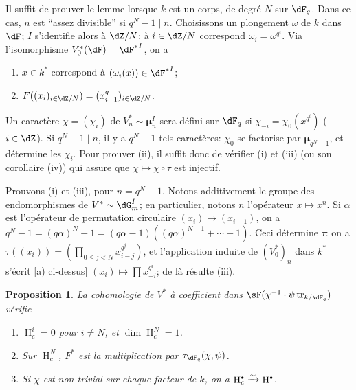 \documentclass[oneside]{book}
\DeclareMathOperator{\h}{H}
\DeclareMathOperator{\tr}{tr}
\newcommand{\dmu}{{\bm\mu}}
\newcommand{\iso}{\xrightarrow\sim}
\theoremstyle{sga-source}
\theoremstyle{sga-source-dash}
\theoremstyle{sga-source-dotdash}
\theoremstyle{sga-source-number-note-dash}
\theoremstyle{sga-source-note-number-dotdash}
\theoremstyle{sga-source-example-dotdash}
\theoremstyle{sga-source-inline-number}
\theoremstyle{sga-source-bare-number}
\theoremstyle{sga-source}
\newtheorem{proposition_}[subsection]{Proposition}
\let\oldbullet\bullet
\renewcommand{\bullet}{\textnormal{\tiny$\oldbullet$}}
\newcommand{\PrintPage}[1]{}\newcommand{\MathPage}[1]{}\newcommand{\PrintCite}[2]{#1}\newcommand{\var}[3]{#2}
\begin{document}
Il suffit de prouver le lemme lorsque $k$ est un corps, de degré $N$ sur 
$\dF_q$. Dans ce cas, $n$ est ``assez divisible'' si $q^N-1\mid n$. 
Choisissons \var{un plongement $\omega$ de $k$ dans $\dF_q$}{un plongement $\omega$ de $k$ dans $\dF$}{S45-SOL-0820}; $I$ s'identifie alors 
à $\dZ/N$: à $i\in \dZ/N$ correspond $\omega_i=\omega^{q^i}$. Via 
l'isomorphisme $V_0^\ast(\dF) = {\dF^\ast}^I$, on a 
\begin{enumerate}[\indent a)]
  \item $x\in k^\ast$ correspond à $(\omega_i(x))\in {\dF^\ast}^I$; 
  \item $F((x_i)_{i\in \dZ/N})=(x_{i-1}^q)_{i\in \dZ/N}$. 
\end{enumerate}

\PrintPage{201}
Un caractère $\chi=(\chi_i)$ de $V_n^\ast\sim \dmu_n^I$ sera défini sur 
$\dF_q$ si $\chi_{-i} =\chi_0(x^{q^i})$ ($i\in \dZ$). Si $q^N-1\mid n$, il y a 
$q^N-1$ tels caractères: $\chi_0$ se factorise par $\dmu_{q^N-1}$, et 
détermine les $\chi_i$. Pour prouver (ii), il suffit donc de vérifier (i) 
et (iii) (ou son corollaire (iv)) qui assure que $\chi\mapsto \chi\circ \tau$ 
est injectif. 

Prouvons (i) et (iii), pour $n=q^N-1$. Notons additivement le groupe des 
endomorphismes de $V^\ast\sim \dG_m^I$; en particulier, notons $n$ 
l'opérateur $x\mapsto x^n$. Si $\alpha$ est l'opérateur de permutation 
circulaire $(x_i)\mapsto (x_{i-1})$, on a 
$q^N-1=(q\alpha)^N-1 = (q\alpha-1)((q\alpha)^{N-1}+\cdots + 1)$. Ceci 
détermine $\tau$: on a $\tau((x_i)) = (\prod_{0\leqslant j<N} x_{i-j}^{q^j})$, 
et l'application induite de $(V_0^\ast)_n$ dans $k^\ast$ s'écrit [a) 
ci-dessus] $(x_i)\mapsto \prod x_{-i}^{q^i}$; de là résulte (iii). 





\begin{proposition_}\label{VI:4-10}
La cohomologie de $V^\ast$ à coefficient dans 
$\sF(\chi^{-1}\cdot \psi\tr_{k/\dF_q})$ vérifie 
\begin{enumerate}[\indent (i)]
  \item $\h_c^i = 0$ pour $i\ne N$, et $\dim \h_c^N=1$. 
  \item Sur $\h_c^N$, $F^\ast$ est la multiplication par 
    $\tau_{\dF_q}(\chi,\psi)$. 
  \item Si $\chi$ est non trivial sur chaque facteur de $k$, on a 
    $\h_c^\bullet \iso \h^\bullet$. 
\end{enumerate}
\end{proposition_}
\end{document}
